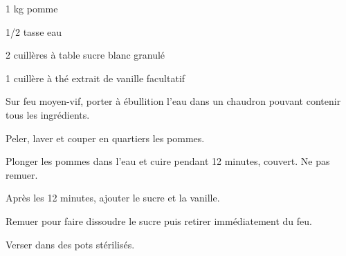 


\totaltime{}


\begin{ingredients}
    \item 1 kg pomme
    \item 1/2 tasse eau
    \item 2 cuillères à table sucre blanc granulé
    \item 1 cuillère à thé extrait de vanille facultatif
\end{ingredients}

\begin{steps}
    \item Sur feu moyen-vif, porter à ébullition l'eau dans un chaudron pouvant contenir tous les ingrédients.
    \item Peler, laver et couper en quartiers les pommes.
    \item Plonger les pommes dans l'eau et cuire pendant 12 minutes, couvert. Ne pas remuer.
    \item Après les 12 minutes, ajouter le sucre et la vanille.
    \item Remuer pour faire dissoudre le sucre puis retirer immédiatement du feu.
    \item Verser dans des pots stérilisés.
\end{steps}
